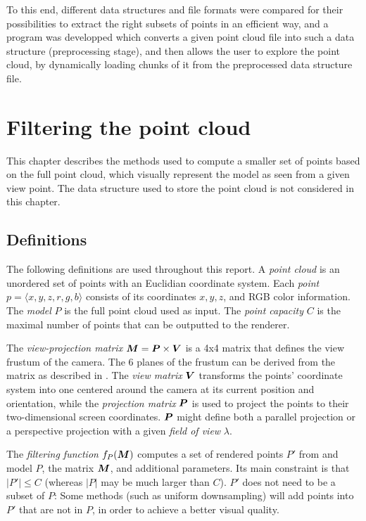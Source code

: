 \documentclass[a4paper,10pt,abstracton,notitlepage]{scrreprt}
\begin{document}
To this end, different data structures and file formats were compared for their possibilities to extract the right subsets of points in an efficient way, and a program was developped which converts a given point cloud file into such a data structure (preprocessing stage), and then allows the user to explore the point cloud, by dynamically loading chunks of it from the preprocessed data structure file.


\chapter{Filtering the point cloud}
This chapter describes the methods used to compute a smaller set of points based on the full point cloud, which visually represent the model as seen from a given view point. The data structure used to store the point cloud is not considered in this chapter.

\section{Definitions}
The following definitions are used throughout this report. A \emph{point cloud} is an unordered set of points with an Euclidian coordinate system. Each \emph{point} $p = \langle x, y, z, r, g, b\rangle$ consists of its coordinates $x, y, z$, and RGB color information. The \emph{model} $P$ is the full point cloud used as input. The \emph{point capacity} $C$ is the maximal number of points that can be outputted to the renderer. 

The \emph{view-projection matrix} $\matrixsym{M} = \matrixsym{P} \times \matrixsym{V}$ is a 4x4 matrix that defines the view frustum of the camera. The 6 planes of the frustum can be derived from the matrix as described in \cite{Gri2001}. The \emph{view matrix} $\matrixsym{V}$ transforms the points' coordinate system into one centered around the camera at its current position and orientation, while the \emph{projection matrix} $\matrixsym{P}$ is used to project the points to their two-dimensional screen coordinates. $\matrixsym{P}$ might define both a parallel projection or a perspective projection with a given \emph{field of view} $\lambda$.

The \emph{filtering function} $f_{P}(\matrixsym{M})$ computes a set of rendered points $P'$ from and model $P$, the matrix $\matrixsym{M}$, and additional parameters. Its main constraint is that $|P'| \leq C$ (whereas $|P|$ may be much larger than $C$). $P'$ does not need to be a subset of $P$: Some methods (such as uniform downsampling) will add points into $P'$ that are not in $P$, in order to achieve a better visual quality.
\end{document}
